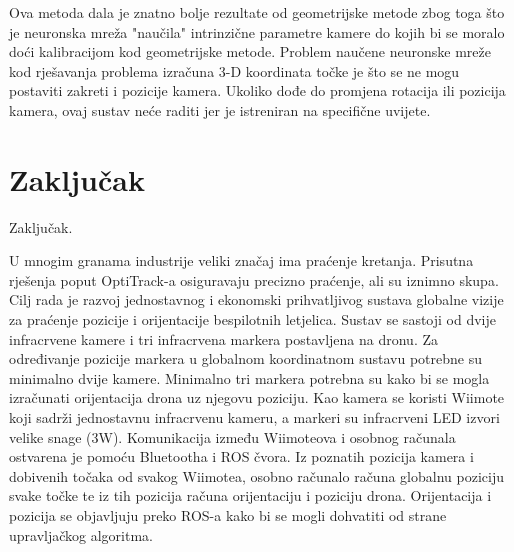 \documentclass[times, utf8, diplomski]{fer}
\begin{document}
Ova metoda dala je znatno bolje rezultate od geometrijske metode zbog toga što je neuronska mreža "naučila" intrinzične parametre kamere do kojih bi se moralo doći kalibracijom kod geometrijske metode. Problem naučene neuronske mreže kod rješavanja problema izračuna 3-D koordinata točke je što se ne mogu postaviti zakreti i pozicije kamera. Ukoliko dođe do promjena rotacija ili pozicija kamera, ovaj sustav neće raditi jer je istreniran na specifične uvijete.  

\chapter{Zaključak}
Zaključak.




\begin{sazetak}
U mnogim granama industrije veliki značaj ima praćenje kretanja. Prisutna rješenja poput OptiTrack-a osiguravaju precizno praćenje, ali su iznimno skupa. Cilj rada je razvoj jednostavnog i ekonomski prihvatljivog sustava globalne vizije za praćenje pozicije i orijentacije bespilotnih letjelica. Sustav se sastoji od dvije infracrvene kamere i tri infracrvena markera postavljena na dronu. Za određivanje pozicije markera u globalnom koordinatnom sustavu potrebne su minimalno dvije kamere. Minimalno tri markera potrebna su kako bi se mogla izračunati orijentacija drona uz njegovu poziciju. Kao kamera se koristi Wiimote koji sadrži jednostavnu infracrvenu kameru, a markeri su infracrveni LED izvori velike snage (3W). Komunikacija između Wiimoteova i osobnog računala ostvarena je pomoću Bluetootha i ROS čvora. Iz poznatih pozicija kamera i dobivenih točaka od svakog Wiimotea, osobno računalo računa globalnu poziciju svake točke te iz tih pozicija računa orijentaciju i poziciju drona. Orijentacija i pozicija se objavljuju preko ROS-a kako bi se mogli dohvatiti od strane upravljačkog algoritma. 

\end{sazetak}
\newpage
\end{document}
